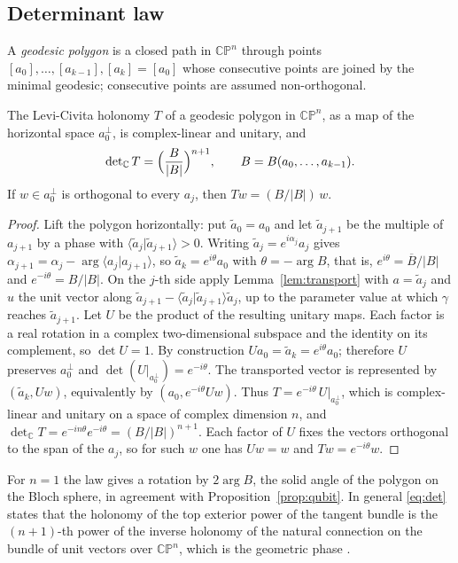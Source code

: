 \subsection{Determinant law}
A \emph{geodesic polygon} is a closed path in $\mathbb{CP}^n$ through points $[a_0],\dots,[a_{k-1}],[a_k]=[a_0]$ whose consecutive points are joined by the minimal geodesic; consecutive points are assumed non-orthogonal.

\begin{proposition}\label{prop:det}
The Levi-Civita holonomy $T$ of a geodesic polygon in $\mathbb{CP}^n$, as a map of the horizontal space $a_0^\perp$, is complex-linear and unitary, and
\begin{equation}\label{eq:det}
\det\nolimits_{\mathbb{C}}T=\Bigl(\frac{B}{|B|}\Bigr)^{n+1},\qquad B=B(a_0,\dots,a_{k-1}).
\end{equation}
If $w\in a_0^\perp$ is orthogonal to every $a_j$, then $Tw=(B/|B|)\,w$.
\end{proposition}
\begin{proof}
Lift the polygon horizontally: put $\tilde a_0=a_0$ and let $\tilde a_{j+1}$ be the multiple of $a_{j+1}$ by a phase with $\langle\tilde a_j|\tilde a_{j+1}\rangle>0$. Writing $\tilde a_j=e^{i\alpha_j}a_j$ gives $\alpha_{j+1}=\alpha_j-\arg\langle a_j|a_{j+1}\rangle$, so $\tilde a_k=e^{i\theta}a_0$ with $\theta=-\arg B$, that is, $e^{i\theta}=\overline{B}/|B|$ and $e^{-i\theta}=B/|B|$. On the $j$-th side apply Lemma~\ref{lem:transport} with $a=\tilde a_j$ and $u$ the unit vector along $\tilde a_{j+1}-\langle\tilde a_j|\tilde a_{j+1}\rangle\tilde a_j$, up to the parameter value at which $\gamma$ reaches $\tilde a_{j+1}$. Let $U$ be the product of the resulting unitary maps. Each factor is a real rotation in a complex two-dimensional subspace and the identity on its complement, so $\det U=1$. By construction $Ua_0=\tilde a_k=e^{i\theta}a_0$; therefore $U$ preserves $a_0^\perp$ and $\det(U|_{a_0^\perp})=e^{-i\theta}$. The transported vector is represented by $(\tilde a_k,Uw)$, equivalently by $(a_0,e^{-i\theta}Uw)$. Thus $T=e^{-i\theta}\,U|_{a_0^\perp}$, which is complex-linear and unitary on a space of complex dimension $n$, and $\det_{\mathbb{C}}T=e^{-in\theta}e^{-i\theta}=(B/|B|)^{n+1}$. Each factor of $U$ fixes the vectors orthogonal to the span of the $a_j$, so for such $w$ one has $Uw=w$ and $Tw=e^{-i\theta}w$.
\end{proof}

\begin{remark}
For $n=1$ the law gives a rotation by $2\arg B$, the solid angle of the polygon on the Bloch sphere, in agreement with Proposition~\ref{prop:qubit}. In general \eqref{eq:det} states that the holonomy of the top exterior power of the tangent bundle is the $(n+1)$-th power of the inverse holonomy of the natural connection on the bundle of unit vectors over $\mathbb{CP}^n$, which is the geometric phase \cite{berry,simon,samuelbhandari}.
\end{remark}

